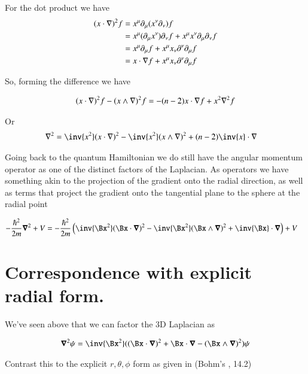 For the dot product we have
\begin{align*}
(x \cdot \nabla)^2 f 
&=
x^\mu \partial_\mu( x^\nu \partial_\nu ) f \\
&=
x^\mu (\partial_\mu x^\nu) \partial_\nu  f + x^\mu x^\nu \partial_\mu \partial_\nu f \\
&=
x^\mu \partial_\mu f + x^\mu x_\nu \partial^\nu \partial_\mu f \\
&=
x \cdot \nabla f + x^\mu x_\nu \partial^\nu \partial_\mu f \\
\end{align*}

So, forming the difference we have

\begin{align*}
(x \cdot \nabla)^2 f - (x \wedge \nabla)^2 f &=
-(n - 2) x \cdot \nabla f + x^2 \nabla^2 f \\
\end{align*}

Or
\begin{align}
\grad^2 &= \inv{x^2} (x \cdot \grad)^2 - \inv{x^2} (x \wedge \grad)^2 + (n - 2) \inv{x} \cdot \grad 
\end{align}

Going back to the quantum Hamiltonian we do still have the angular momentum operator as one of the distinct factors of the Laplacian.  As operators we have something akin to the projection of the gradient onto the radial direction, as well as terms that project the gradient onto the tangential plane to the sphere at the radial point

\begin{align}
-\frac{\hbar^2}{2m} \spacegrad^2 + V
&=
-\frac{\hbar^2}{2m} \left( \inv{\Bx^2} (\Bx \cdot \spacegrad)^2 - \inv{\Bx^2} (\Bx \wedge \spacegrad)^2 + \inv{\Bx} \cdot \spacegrad \right) + V
\end{align}

\section{Correspondence with explicit radial form.}

We've seen above that we can factor the 3D Laplacian as 

\begin{align}\label{eqn:qmAngularMom:foo1}
\spacegrad^2 \psi = \inv{\Bx^2}( (\Bx \cdot \spacegrad)^2 + \Bx \cdot \spacegrad - (\Bx \wedge \spacegrad)^2) \psi
\end{align}

Contrast this to the explicit $r,\theta,\phi$ form as given in (Bohm's \cite{bohm1989qt}, 14.2)

